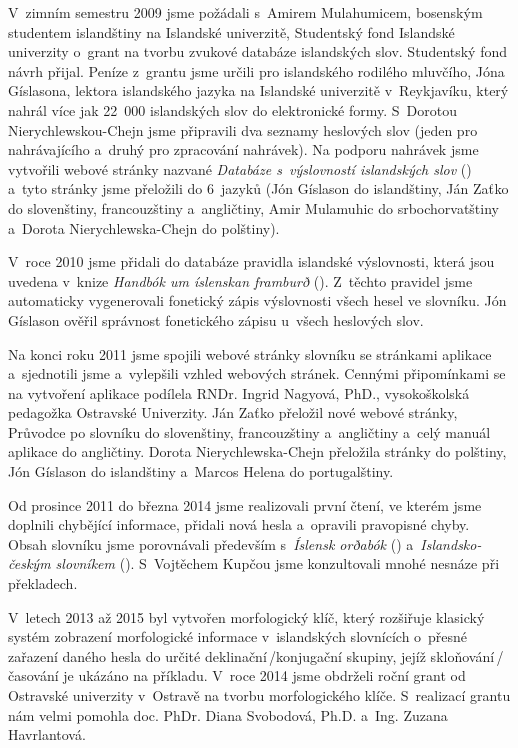 V~zimním semestru 2009 jsme požádali s~Amirem Mulahumicem, bosenským studentem islandštiny na Islandské univerzitě, Studentský fond Islandské univerzity o~grant na tvorbu zvukové databáze islandských slov. 
Studentský fond návrh přijal. Peníze z~grantu jsme určili pro islandského rodilého mluvčího, Jóna Gíslasona, lektora islandského jazyka na Islandské univerzitě v~Reykjavíku, který nahrál více jak 22~000 islandských slov do elektronické formy. 
S~Dorotou Nierychlewskou-Chejn jsme připravili dva seznamy heslových slov (jeden pro nahrávajícího a~druhý pro zpracování nahrávek). Na podporu nahrávek jsme vytvořili webové stránky nazvané \textit{Databáze s~výslovností islandských slov} (\cite {int13}) a~tyto stránky jsme přeložili do 6~jazyků (Jón Gíslason do islandštiny, Ján Zaťko do slovenštiny, francouzštiny a~angličtiny, Amir Mulamuhic do srbochorvatštiny a~Dorota Nierychlewska-Chejn do polštiny).

V~roce 2010 jsme přidali do databáze pravidla islandské výslovnosti, která jsou uvedena v~knize \textit{Handbók um íslenskan framburð} (\cite {is2}). Z~těchto pravidel jsme automaticky vygenerovali fonetický zápis výslovnosti všech hesel ve slovníku. 
Jón Gíslason ověřil správnost fonetického zápisu u~všech heslových slov.

Na konci roku 2011 jsme spojili webové stránky slovníku se stránkami aplikace a~sjednotili jsme a~vylepšili vzhled webových stránek. Cennými připomínkami se na vytvoření aplikace podílela
RNDr. Ingrid Nagyová, PhD., vysokoškolská pedagožka Ostravské Univerzity. Ján Zaťko přeložil nové webové stránky, Průvodce po slovníku do slovenštiny, francouzštiny a~angličtiny a~celý manuál aplikace do angličtiny. 
Dorota Nierychlewska-Chejn přeložila stránky do polštiny, Jón Gíslason do islandštiny a~Marcos Helena do portugalštiny.

Od prosince 2011 do března 2014 jsme realizovali první čtení, ve kterém jsme doplnili chybějící informace, přidali nová hesla a~opravili pravopisné chyby. 
Obsah slovníku jsme porovnávali především s~\textit{Íslensk orðabók} (\mbox{\cite {is}}) a~\textit{Islandsko-českým slovníkem} (\cite {is7}). S~Vojtěchem Kupčou jsme konzultovali mnohé nesnáze při překladech.

V~letech 2013 až 2015 byl vytvořen morfologický klíč, který rozšiřuje klasický systém zobrazení morfologické informace v~islandských slovnících o~přesné zařazení daného hesla do určité deklinační\,/\addthin konjugační skupiny, jejíž
skloňování\,/\addthin časování je ukázáno na příkladu. V~roce 2014 jsme obdrželi roční grant od Ostravské univerzity v~Ostravě na tvorbu morfologického klíče. S~realizací grantu nám velmi pomohla doc. PhDr. Diana Svobodová, Ph.D. a~Ing. Zuzana Havrlantová.

